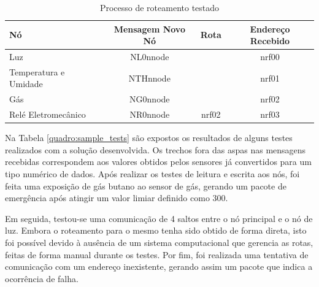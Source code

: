 {\begin{table}[H]
	\centering
	\begin{tabular}{|l|c|c|c|}
		\hline
		\textbf{Nó}           & \textbf{Mensagem Novo Nó} & \textbf{Rota} & \textbf{Endereço Recebido} \\ \hline
		Luz                   & NL0nnode & \text{\textbf{---}} & nrf00 \\ \hline
		Temperatura e Umidade & NTHnnode & \text{\textbf{---}} & nrf01 \\ \hline
		Gás                   & NG0nnode & \text{\textbf{---}} & nrf02 \\ \hline
		Relé Eletromecânico   & NR0nnode & nrf02         & nrf03       \\ \hline
	\end{tabular}
	\caption{Processo de roteamento testado}
	\label{quadro:test_route}
\end{table}

Na Tabela \ref{quadro:sample_tests} são expostos os resultados de alguns testes realizados com a solução
desenvolvida. Os trechos fora das aspas nas mensagens recebidas correspondem aos valores obtidos pelos
sensores já convertidos para um tipo numérico de dados. Após realizar os testes de leitura e escrita aos nós,
foi feita uma exposição de gás butano ao sensor de gás, gerando um pacote de emergência após atingir um
valor limiar definido como 300.

Em seguida, testou-se uma comunicação de 4 saltos entre o nó principal e o nó de luz. Embora o roteamento para
o mesmo tenha sido obtido de forma direta, isto foi possível devido à ausência de um sistema computacional que
gerencia as rotas, feitas de forma manual durante os testes. Por fim, foi realizada uma tentativa de
comunicação com um endereço inexistente, gerando assim um pacote que indica a ocorrência de falha.

}
